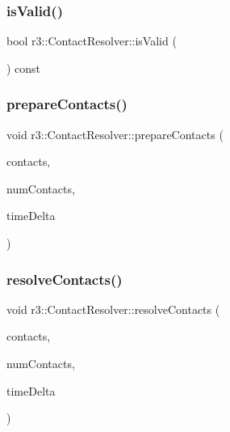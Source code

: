 \mbox{\label{classr3_1_1_contact_resolver_a7864d5856905dfc9b083931c891dddc6}} 
\subsubsection{\texorpdfstring{is\+Valid()}{isValid()}}
{\footnotesize\ttfamily bool r3\+::\+Contact\+Resolver\+::is\+Valid (\begin{DoxyParamCaption}{ }\end{DoxyParamCaption}) const}

\mbox{\label{classr3_1_1_contact_resolver_ac791c4cb45b46702014703c54cd97f0f}} 
\subsubsection{\texorpdfstring{prepare\+Contacts()}{prepareContacts()}}
{\footnotesize\ttfamily void r3\+::\+Contact\+Resolver\+::prepare\+Contacts (\begin{DoxyParamCaption}\item[{\mbox{\hyperlink{classr3_1_1_contact_old}{Contact\+Old}} $\ast$}]{contacts,  }\item[{unsigned}]{num\+Contacts,  }\item[{\mbox{\hyperlink{namespacer3_ab2016b3e3f743fb735afce242f0dc1eb}{real}}}]{time\+Delta }\end{DoxyParamCaption})}

\mbox{\label{classr3_1_1_contact_resolver_a3ec12f4cbf8b42e1d481a77173b664c1}} 
\subsubsection{\texorpdfstring{resolve\+Contacts()}{resolveContacts()}}
{\footnotesize\ttfamily void r3\+::\+Contact\+Resolver\+::resolve\+Contacts (\begin{DoxyParamCaption}\item[{\mbox{\hyperlink{classr3_1_1_contact_old}{Contact\+Old}} $\ast$}]{contacts,  }\item[{unsigned}]{num\+Contacts,  }\item[{\mbox{\hyperlink{namespacer3_ab2016b3e3f743fb735afce242f0dc1eb}{real}}}]{time\+Delta }\end{DoxyParamCaption})}


